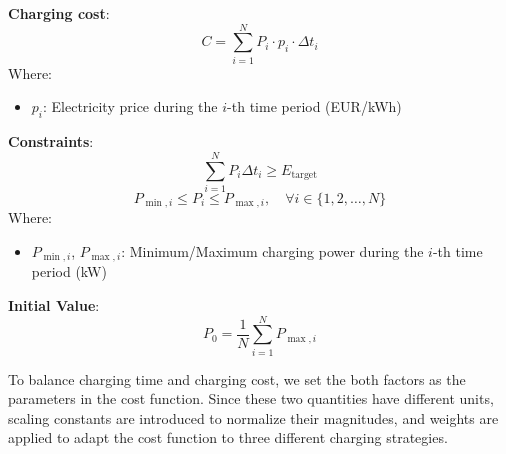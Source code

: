 \documentclass[
english,
ruledheaders=section,%
class=report,%
thesis={type=Report},%
accentcolor=9c,%
custommargins=true,%
marginpar=false,%
parskip=half-,%
fontsize=11pt,%
logofile={img/tuda_logo.pdf}, %
]{tudapub}
\begin{document}
    \textbf{Charging cost}:
    \begin{equation}
        C = \sum_{i=1}^{N} P_i \cdot p_i \cdot \Delta t_i
    \end{equation}
    Where:
    \begin{itemize}
        \item $p_i$: Electricity price during the $i$-th time period (EUR/kWh)
    \end{itemize}

    \textbf{Constraints}:
    \begin{equation}
        \sum_{i=1}^{N} P_i \Delta t_i \geq E_{\text{target}}
    \end{equation}
    \begin{equation}
        P_{\min, i} \leq P_i \leq P_{\max, i}, \quad \forall i \in \{1, 2, \dots, N\}
    \end{equation}
    Where:
    \begin{itemize}
        \item $P_{\min, i}$, $P_{\max, i}$: Minimum/Maximum charging power during the $i$-th time period (kW)
    \end{itemize}

    \textbf{Initial Value}:
    \begin{equation}
        P_0 = \frac{1}{N} \sum_{i=1}^{N} P_{\max, i}
    \end{equation}




    To balance charging time and charging cost, we set the both factors as the parameters in the cost function. Since these two quantities have different units, scaling constants are introduced to normalize their magnitudes, and weights are applied to adapt the cost function to three different charging strategies.
\end{document}
